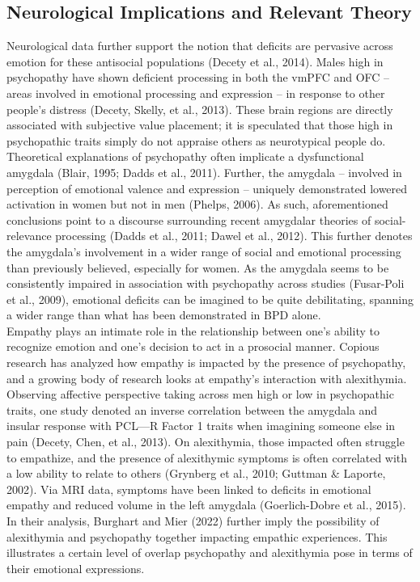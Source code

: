 \documentclass[
  man,floatsintext]{apa7}
\begin{document}
\hypertarget{neurological-implications-and-relevant-theory}{%
\subsection{Neurological Implications and Relevant Theory}\label{neurological-implications-and-relevant-theory}}

Neurological data further support the notion that deficits are pervasive across emotion for these antisocial populations (Decety et al., 2014). Males high in psychopathy have shown deficient processing in both the vmPFC and OFC -- areas involved in emotional processing and expression -- in response to other people's distress (Decety, Skelly, et al., 2013). These brain regions are directly associated with subjective value placement; it is speculated that those high in psychopathic traits simply do not appraise others as neurotypical people do. Theoretical explanations of psychopathy often implicate a dysfunctional amygdala (Blair, 1995; Dadds et al., 2011). Further, the amygdala -- involved in perception of emotional valence and expression -- uniquely demonstrated lowered activation in women but not in men (Phelps, 2006). As such, aforementioned conclusions point to a discourse surrounding recent amygdalar theories of social-relevance processing (Dadds et al., 2011; Dawel et al., 2012). This further denotes the amygdala's involvement in a wider range of social and emotional processing than previously believed, especially for women. As the amygdala seems to be consistently impaired in association with psychopathy across studies (Fusar-Poli et al., 2009), emotional deficits can be imagined to be quite debilitating, spanning a wider range than what has been demonstrated in BPD alone.\\
Empathy plays an intimate role in the relationship between one's ability to recognize emotion and one's decision to act in a prosocial manner. Copious research has analyzed how empathy is impacted by the presence of psychopathy, and a growing body of research looks at empathy's interaction with alexithymia. Observing affective perspective taking across men high or low in psychopathic traits, one study denoted an inverse correlation between the amygdala and insular response with PCL---R Factor 1 traits when imagining someone else in pain (Decety, Chen, et al., 2013). On alexithymia, those impacted often struggle to empathize, and the presence of alexithymic symptoms is often correlated with a low ability to relate to others (Grynberg et al., 2010; Guttman \& Laporte, 2002). Via MRI data, symptoms have been linked to deficits in emotional empathy and reduced volume in the left amygdala (Goerlich-Dobre et al., 2015). In their analysis, Burghart and Mier (2022) further imply the possibility of alexithymia and psychopathy together impacting empathic experiences. This illustrates a certain level of overlap psychopathy and alexithymia pose in terms of their emotional expressions.\\
\end{document}
